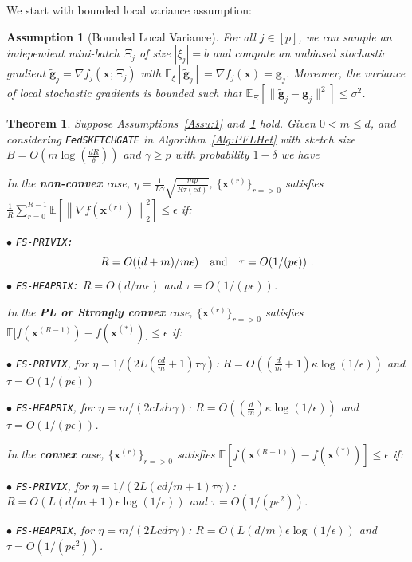 \documentclass{article} %
\newtheorem{theorem}{Theorem}
\newtheorem{assumption}{Assumption}
\begin{document}
We start with bounded local variance assumption:
\begin{assumption}[Bounded Local Variance]\label{Assu:2}
For all $j\in [p]$, we can sample an independent mini-batch $\Xi_j$ of size $|{\xi}_j| = b$ and compute an unbiased stochastic gradient $\tilde{\mathbf{g}}_j = \nabla f_j(\boldsymbol{x}; \Xi_j)$ with $\mathbb{E}_{\xi}[\tilde{\mathbf{g}}_j] = \nabla f_{j}(\boldsymbol{x})={\mathbf{g}}_j$. 
Moreover, the variance of local stochastic gradients is bounded such that $
\mathbb{E}_{\Xi}\left[\|\tilde{\mathbf{g}}_j-{\mathbf{g}}_j\|^2\right]\leq \sigma^2$.
\end{assumption}
\begin{theorem}\label{thm:hetreg_case}
Suppose Assumptions~\ref{Assu:1} and~\ref{Assu:2} hold. Given $0<m\leq d$, and considering \texttt{FedSKETCHGATE} in Algorithm~\ref{Alg:PFLHet} with sketch size $B=O\left(m\log\left(\frac{d R}{\delta}\right)\right)$ and $\gamma\geq p$ with probability $1-\delta$ we have  



In the \textbf{non-convex} case, $\eta=\frac{1}{L\gamma}\sqrt{\frac{mp}{R\tau\left(cd\right)}}$, $\{ {\boldsymbol{x}}^{(r)}\}_{r=>0}$ satisfies  $\frac{1}{R}\sum_{r=0}^{R-1}\mathbb{E}\left[\left\|\nabla f({\boldsymbol{x}}^{(r)})\right\|_2^2\right]\leq {\epsilon}$ if: 
 
\noindent $\bullet$ \texttt{FS-PRIVIX:}    
\begin{equation}\notag
R=O((d+m)/m\epsilon) \quad \textrm{and} \quad \tau=O(1/(p\epsilon))\ .
 \end{equation}
\noindent $\bullet$ \texttt{FS-HEAPRIX:} $R=O(d/m\epsilon)$ and $\tau=O(1/(p\epsilon))$.

In the \textbf{PL or Strongly convex} case, $\{ {\boldsymbol{x}}^{(r)}\}_{r=>0}$ satisfies $\mathbb{E}\Big[f({\boldsymbol{x}}^{(R-1)})-f({\boldsymbol{x}}^{(*)})\Big]\leq \epsilon$ if: 

\noindent $\bullet$ \texttt{FS-PRIVIX}, for $\eta=1/(2L(\frac{cd}{m}+1)\tau\gamma)$: $R=O\left((\frac{d}{m}+1)\kappa \log(1/\epsilon)\right)$ and $\tau=O\left(1/(p\epsilon)\right)$

\noindent $\bullet$ \texttt{FS-HEAPRIX}, for $\eta=m/(2cLd\tau\gamma)$: $R=O\left((\frac{d}{m})\kappa \log(1/\epsilon)\right)$ and $\tau=O\left(1/(p\epsilon)\right)$.

 In the \textbf{convex} case, $\{ {\boldsymbol{x}}^{(r)}\}_{r=>0}$ satisfies $ \mathbb{E}[f({\boldsymbol{x}}^{(R-1)})-f({\boldsymbol{x}}^{(*)})]\leq \epsilon$ if: 
 
\noindent $\bullet$ \texttt{FS-PRIVIX}, for $\eta=1/(2L(c d/m+1)\tau\gamma)$:  $R=O\left(L(d/m+1)\epsilon \log(1/\epsilon)\right)$ and $\tau=O\left(1/(p\epsilon^2)\right)$.

\noindent $\bullet$ \texttt{FS-HEAPRIX}, for $\eta=m/(2L c d\tau\gamma)$: $R=O\left(L(d/m)\epsilon \log(1/\epsilon)\right)$ and $\tau=O\left(1/(p\epsilon^2)\right)$.
 \end{theorem}
\end{document}
